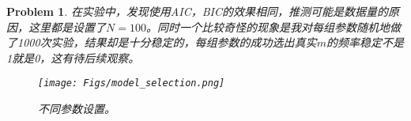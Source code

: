\documentclass[UTF8]{article}
\makeatletter
\newtheorem{hw}{Problem}
\newenvironment{sol}
\renewcommand{\caption}[2][\relax]{%

			{\raggedright\textbf{\ALG@name~\thealgorithm} ##2\par}%

			\ifx\relax##1\relax %

			\addcontentsline{loa}{algorithm}{\protect\numberline{\thealgorithm}##2}%

			\else %

			\addcontentsline{loa}{algorithm}{\protect\numberline{\thealgorithm}##1}%

			\fi

			\kern2pt\hrule\kern2pt

		}
\makeatother
\begin{document}
\begin{hw}
\begin{sol}
		

		在实验中，发现使用AIC，BIC的效果相同，推测可能是数据量的原因，这里都是设置了$N=100$。同时一个比较奇怪的现象是我对每组参数随机地做了1000次实验，结果却是十分稳定的，每组参数的成功选出真实$m$的频率稳定不是1就是0，这有待后续观察。

		

		\begin{figure}

			\centering

			\texttt{[image: Figs/model\_selection.png]}

			\vspace{-0.1cm}

			\caption{不同参数设置。}

			\label{fig:compare}

		\end{figure}

	\end{sol}

\end{hw}
\end{document}
